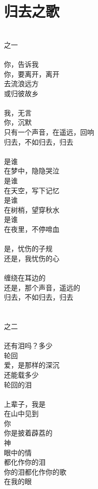\section{归去之歌}
\leftskip=25mm
\noindent \\
之一\\
\\
你，告诉我\\
你，要离开，离开\\
去流浪远方\\
或归彼故乡\\
\\
我，无言\\
你，沉默\\
只有一个声音，在遥远，回响\\
归去，不如归去，归去\\
\\
是谁\\
在梦中，隐隐哭泣\\
是谁\\
在天空，写下记忆\\
是谁\\
在树梢，望穿秋水\\
是谁\\
在夜里，不停啼血\\
\\
是，忧伤的子规\\
还是，我忧伤的心\\
\\
缠绕在耳边的\\
还是，那个声音，遥远的\\
归去，不如归去，归去\\
\\
\\
之二\\
\\
还有泪吗？多少\\
轮回\\
爱，是那样的深沉\\
还能载多少\\
轮回的泪\\
\\
上辈子，我是\\
在山中见到\\
你\\
你是披着薜荔的\\
神\\
眼中的情\\
都化作你的泪\\
你的泪都化作你的歌\\
在我的眼\\
